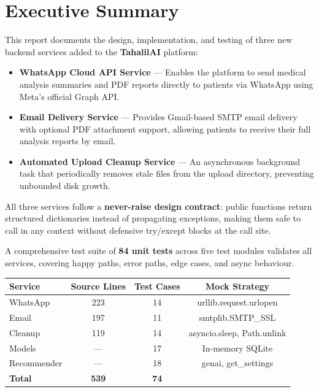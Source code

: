 \documentclass[12pt, a4paper]{article}
\begin{document}
\newpage
\tableofcontents
\newpage

\section{Executive Summary}

This report documents the design, implementation, and testing of three new backend
services added to the \textbf{TahalilAI} platform:

\begin{itemize}[leftmargin=*, itemsep=4pt]
  \item \textbf{WhatsApp Cloud API Service} — Enables the platform to send medical
        analysis summaries and PDF reports directly to patients via WhatsApp using
        Meta's official Graph API.
  \item \textbf{Email Delivery Service} — Provides Gmail-based SMTP email delivery
        with optional PDF attachment support, allowing patients to receive their
        full analysis reports by email.
  \item \textbf{Automated Upload Cleanup Service} — An asynchronous background task
        that periodically removes stale files from the upload directory, preventing
        unbounded disk growth.
\end{itemize}

All three services follow a \textbf{never-raise design contract}: public functions
return structured dictionaries instead of propagating exceptions, making them safe
to call in any context without defensive try/except blocks at the call site.

A comprehensive test suite of \textbf{84 unit tests} across five test modules
validates all services, covering happy paths, error paths, edge cases, and async
behaviour.

\begin{infobox}[title={Key Metrics at a Glance}]
  \begin{tabular}{lccc}
    \toprule
    \textbf{Service} & \textbf{Source Lines} & \textbf{Test Cases} & \textbf{Mock Strategy} \\
    \midrule
    WhatsApp         & 223 & 14 & urllib.request.urlopen \\
    Email            & 197 & 11 & smtplib.SMTP\_SSL \\
    Cleanup          & 119 & 14 & asyncio.sleep, Path.unlink \\
    Models           & ---   & 17 & In-memory SQLite \\
    Recommender      & ---   & 18 & genai, get\_settings \\
    \midrule
    \textbf{Total}   & \textbf{539} & \textbf{74} & \\
    \bottomrule
  \end{tabular}
\end{infobox}
\end{document}
